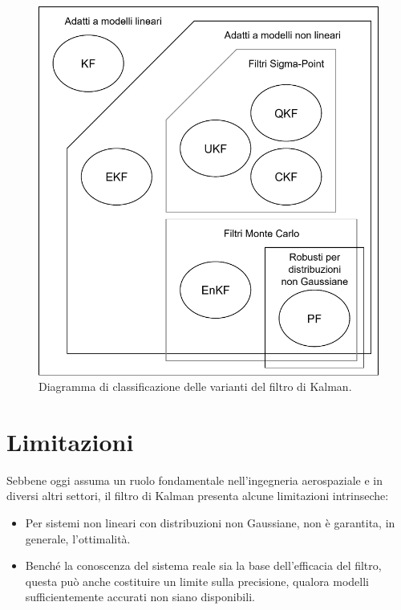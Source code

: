 \documentclass[12pt,a4paper,openright,twoside]{book}
\begin{document}
\begin{figure}
    \centering
    \includegraphics[width=.7\linewidth]{figures/variants-diagram.pdf}
    \caption{Diagramma di classificazione delle varianti del filtro di Kalman.}
    \label{fig:variants-diagram}
    \vspace{2\baselineskip}
\end{figure}

\section{Limitazioni}

Sebbene oggi assuma un ruolo fondamentale nell'ingegneria aerospaziale e in diversi altri settori, il filtro di Kalman presenta alcune limitazioni intrinseche:
\begin{itemize}
\item Per sistemi non lineari con distribuzioni non Gaussiane, non è garantita, in generale, l'ottimalità.
\item Benché la conoscenza del sistema reale sia la base dell'efficacia del filtro, questa può anche costituire un limite sulla precisione, qualora modelli sufficientemente accurati non siano disponibili.
\end{itemize}


\end{document}
